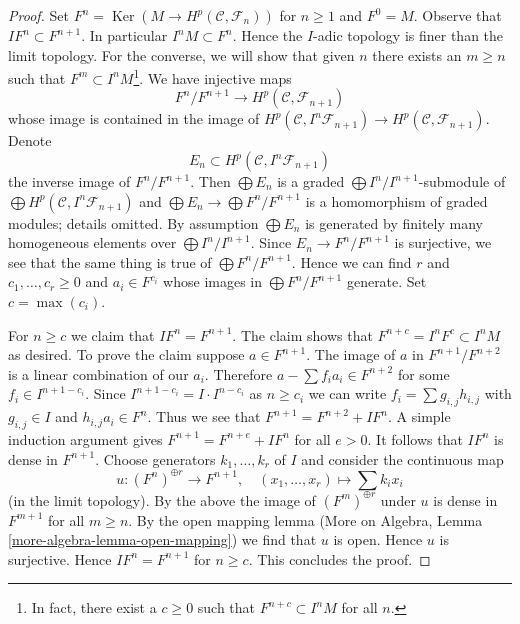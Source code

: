 \documentclass[10pt,a4paper]{amsart}
\theoremstyle{plain}
\theoremstyle{definition}
\theoremstyle{remark}
\numberwithin{equation}{subsection}
\def\Ker{\mathop{\mathrm{Ker}}}
\begin{document}
\begin{proof}
Set $F^n = \Ker(M \to H^p(\mathcal{C}, \mathcal{F}_n))$ for $n \geq 1$ and
$F^0 = M$.
Observe that $I F^n \subset F^{n + 1}$. In particular $I^n M \subset F^n$.
Hence the $I$-adic topology is finer than the limit topology. For
the converse, we will show that given $n$
there exists an $m \geq n$ such that $F^m \subset I^nM$\footnote{In fact,
there exist a $c \geq 0$ such that $F^{n + c} \subset I^nM$ for all $n$.}.
We have injective maps
$$
F^n/F^{n + 1} \longrightarrow H^p(\mathcal{C}, \mathcal{F}_{n + 1})
$$
whose image is contained in the image of
$H^p(\mathcal{C}, I^n\mathcal{F}_{n + 1}) \to
H^p(\mathcal{C}, \mathcal{F}_{n + 1})$.
Denote
$$
E_n \subset H^p(\mathcal{C}, I^n\mathcal{F}_{n + 1})
$$
the inverse image of $F^n/F^{n + 1}$. Then $\bigoplus E_n$ is
a graded $\bigoplus I^n/I^{n + 1}$-submodule of
$\bigoplus H^p(\mathcal{C}, I^n\mathcal{F}_{n + 1})$ and
$\bigoplus E_n \to \bigoplus F^n/F^{n + 1}$ is a homomorphism of graded
modules; details omitted. By assumption $\bigoplus E_n$ is generated by
finitely many homogeneous elements over $\bigoplus I^n/I^{n + 1}$.
Since $E_n \to F^n/F^{n + 1}$ is surjective, we see that
the same thing is true of $\bigoplus F^n/F^{n + 1}$.
Hence we can find $r$ and $c_1, \ldots, c_r \geq 0$ and
$a_i \in F^{c_i}$ whose images in $\bigoplus F^n/F^{n + 1}$ generate.
Set $c = \max(c_i)$.

\medskip\noindent
For $n \geq c$ we claim that $I F^n = F^{n + 1}$. The claim shows that
$F^{n + c} = I^nF^c \subset I^nM$ as desired. To prove the claim
suppose $a \in F^{n + 1}$. The image of
$a$ in $F^{n + 1}/F^{n + 2}$ is a linear combination
of our $a_i$. Therefore $a  - \sum f_i a_i \in F^{n + 2}$
for some $f_i \in I^{n + 1 - c_i}$. Since
$I^{n + 1 - c_i} = I \cdot I^{n - c_i}$ as $n \geq c_i$ we can write
$f_i = \sum g_{i, j} h_{i, j}$ with $g_{i, j} \in I$
and $h_{i, j}a_i \in F^n$. Thus we see that
$F^{n + 1} = F^{n + 2} + IF^n$.
A simple induction argument gives $F^{n + 1} = F^{n + e} + IF^n$
for all $e > 0$. It follows that $IF^n$ is dense in $F^{n + 1}$.
Choose generators $k_1, \ldots, k_r$ of $I$ and consider
the continuous map
$$
u : (F^n)^{\oplus r} \longrightarrow F^{n + 1},\quad
(x_1, \ldots, x_r) \mapsto \sum k_i x_i
$$
(in the limit topology).
By the above the image of $(F^m)^{\oplus r}$ under $u$ is dense in
$F^{m + 1}$ for all $m \geq n$. By the open mapping lemma
(More on Algebra, Lemma \ref{more-algebra-lemma-open-mapping}) we find
that $u$ is open. Hence $u$ is surjective. Hence $IF^n = F^{n + 1}$
for $n \geq c$. This concludes the proof.
\end{proof}
\end{document}
